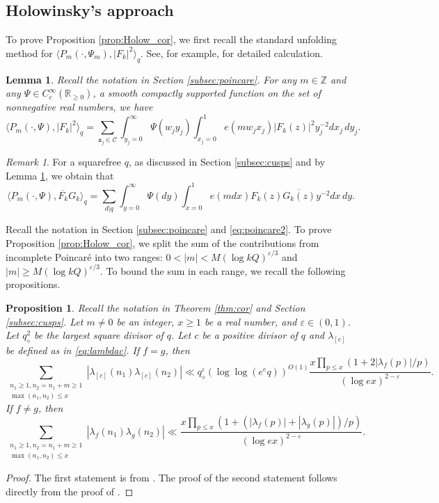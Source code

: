 \documentclass[12pt,reqno]{amsart}
\newtheorem{lem}[thm]{Lemma}
\newtheorem{prop}[thm]{Proposition}
\theoremstyle{remark}
\newtheorem*{rek}{Remark}
\numberwithin{equation}{section}
\begin{document}
	\subsection{Holowinsky's approach}\label{subsec: hol-cor} To prove Proposition \ref{prop:Holow_cor}, we first recall the standard unfolding method  for $\langle P_m(\cdot, \Psi_m), |F_k|^2  \rangle_q$. See, for example, \cite[p. 2398]{YH} for detailed calculation.
    \begin{lem}
    \label{lem:unfolding} Recall the notation in Section \ref{subsec:poincare}.
         For any $m \in \mathbb{Z}$ and any $\Psi \in C^{\infty}_c(\mathbb{R}_{\ge 0})$, a smooth compactly supported function on the set of nonnegative real numbers, we have 
        \[
        \langle P_m(\cdot, \Psi), |F_k|^2 \rangle_q = \sum_{\mathfrak{a}_j \in \mathcal{C}} \int_{y_j=0}^{\infty} \Psi(w_jy_j) \int_{x_j = 0}^{1} e(mw_jx_j)|F_k(z)|^2y_j^{-2}dx_j\,dy_j.
        \]
    \end{lem}
    \begin{rek}\label{rek:unfolding}   
        For a squarefree $q$, as discussed in Section \ref{subsec:cusps} and by Lemma \ref{lem:unfolding}, we obtain that
        \begin{equation}\label{eq:unfolding-2}
			\langle P_m(\cdot, \Psi), \overline{F_k}G_k \rangle_q = 
            \sum_{d|q} \int_{y=0}^{\infty} \Psi(dy) \int_{x = 0}^{1} e(mdx)F_k(z)\overline{G_k(z)} y^{-2}dx\,dy.
		\end{equation} 
    \end{rek}

    
	Recall the notation in Section \ref{subsec:poincare} and \eqref{eq:poincare2}. To prove Proposition \ref{prop:Holow_cor}, we split the sum of the contributions from incomplete Poincar\'e into two ranges: $0<|m|<M(\log kQ)^{\varepsilon/3}$ and  $|m|\ge M(\log kQ)^{\varepsilon/3}$. To  bound the sum in each range, we recall the following propositions. 

	\begin{prop}\label{prop:shiftedcon}
		Recall the notation in Theorem \ref{thm:cor} and Section \ref{subsec:cusps}. Let $m \neq 0$ be an integer, $x \ge 1$ be a real number, and $\varepsilon \in (0,1)$. Let $q_\diamond^2$ be the largest square divisor of $q$. Let $c$ be a positive divisor of $q$ and $\lambda_{[c]}$ be defined as in \eqref{eq:lambdac}. If $f = g$, then 
		\[
		\sum_{\substack{n_1 \ge 1, n_2 = n_1+m \ge 1\\ \max(n_1,n_2) \le x}} |\lambda_{[c]}(n_1)\lambda_{[c]}(n_2)| \ll q_\diamond^\varepsilon (\log\log(e^eq))^{O(1)}\frac{x\prod_{p\le x}(1+2|\lambda_f(p)|/p)}{(\log ex)^{2-\varepsilon}}.
		\]
  If $f \neq g$, then
        \[
		\sum_{\substack{n_1 \ge 1, n_2 = n_1+m \ge 1 \\ \max(n_1,n_2) \le x}} |\lambda_{f}(n_1)\lambda_{g}(n_2)| \ll \frac{x\prod_{p\le x}(1+(|\lambda_f(p)|+ |\lambda_g(p)|)/p)}{(\log ex)^{2-\varepsilon}}.
		\]
	\end{prop}
        \begin{proof} The first statement is from \cite[Proposition~3.17]{NPS}. The proof of the second statement follows directly from the proof of \cite[Theorem~3.10]{N}.
        \end{proof}
 
\end{document}
